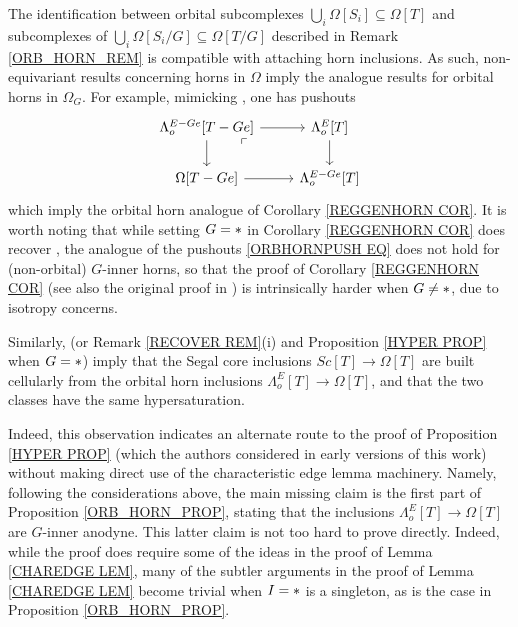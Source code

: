 \documentclass[a4paper,10pt
,draft
]{article}%
\begin{document}
\begin{remark}
	The identification between orbital subcomplexes 
	$\bigcup_i \Omega[S_i] \subseteq \Omega[T]$ and subcomplexes of 
	$\bigcup_i \Omega[S_i/G] \subseteq \Omega[T/G]$
	described in Remark \ref{ORB_HORN_REM}
	is compatible with attaching horn inclusions.
	As such, non-equivariant results concerning horns in $\Omega$
	imply the analogue results for orbital horns in $\Omega_G$. For example, mimicking \cite[Lemma 5.1]{MW09}, one has pushouts	
\begin{equation}\label{ORBHORNPUSH EQ}
\begin{tikzcd}
	\Lambda^{E - G e}_o[T - Ge] \arrow[r] \arrow[d]
	\arrow[dr, phantom, "\ulcorner", very near start] &
	\Lambda^{E}_o[T] \arrow[d]
\\
	\Omega[T - G e] \arrow[r]&
	\Lambda^{E - G e}_o[T]
\end{tikzcd}
\end{equation}	
which imply the orbital horn analogue of 
Corollary \ref{REGGENHORN COR}.
It is worth noting that while setting $G=\**$ in 
Corollary \ref{REGGENHORN COR} does recover
\cite[Lemma 5.1]{MW09}, 
the analogue of the pushouts \eqref{ORBHORNPUSH EQ}
does not hold for (non-orbital) $G$-inner horns,
so that the proof of Corollary \ref{REGGENHORN COR}
(see also the original proof in \cite[Prop. 6.17]{Per17})
is intrinsically harder when $G \neq \**$,
due to isotropy concerns.

Similarly, \cite[Props. 2.4 and 2.5]{CM13a} 
(or Remark \ref{RECOVER REM}(i) and Proposition \ref{HYPER PROP} when $G=\**$)
imply that the Segal core inclusions 
$Sc[T] \to \Omega[T]$
are built cellularly from the orbital horn inclusions
$\Lambda^E_o[T] \to \Omega[T]$, and that the two classes have the same hypersaturation. 

	Indeed, this observation indicates an alternate route to the proof of Proposition \ref{HYPER PROP}
	(which the authors considered in early versions of this work)
	without making direct use of the characteristic edge lemma machinery.
	Namely, following the considerations above, the main missing claim is the first part of Proposition \ref{ORB_HORN_PROP}, stating that the inclusions
	$\Lambda^E_o[T] \to \Omega[T]$ are $G$-inner anodyne.
	This latter claim is not too hard to prove directly. 
	Indeed, while the proof does require some of the ideas in the proof of Lemma \ref{CHAREDGE LEM},
	many of the subtler arguments in the proof of Lemma \ref{CHAREDGE LEM}
become trivial when $I=\**$ is a singleton, as is the case in Proposition \ref{ORB_HORN_PROP}.
\end{remark}
\end{document}

